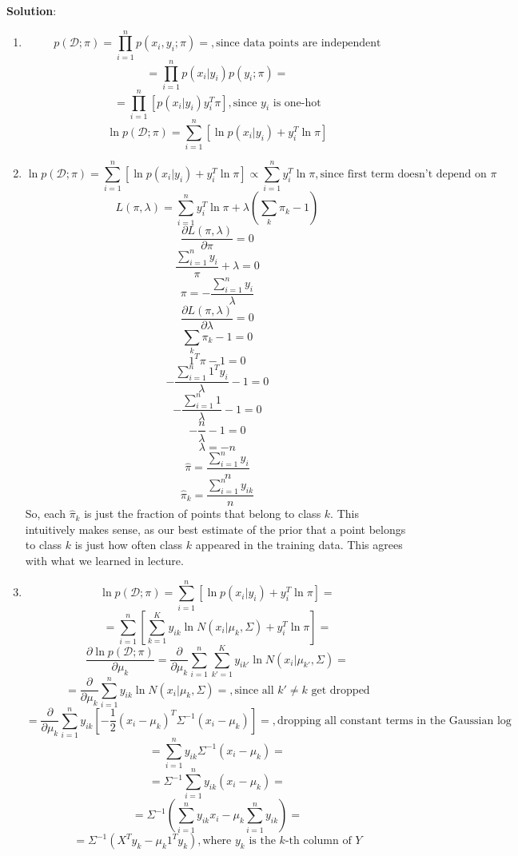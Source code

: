 \documentclass[submit]{../harvardml}
\newenvironment{solution}{
    \vspace{2mm}
    \color{blue}\noindent\textbf{Solution}:
}{}
\begin{document}
\begin{solution}
	\begin{enumerate}
	    \item $$p(\mathcal{D} ; \pi) = \prod_{i = 1}^np(x_i, y_i;\pi) = ,\text{since data points are independent}$$
        $$ = \prod_{i = 1}^np(x_i| y_i)p(y_i;\pi)=$$
        $$ = \prod_{i = 1}^n[p(x_i| y_i)y_i^T\pi], \text{since $y_i$ is one-hot}$$
        $$\ln p(\mathcal{D} ; \pi) = \sum_{i = 1}^n[\ln p(x_i| y_i) + y_i^T\ln \pi]$$
        \item $$\ln p(\mathcal{D} ; \pi) = \sum_{i = 1}^n[\ln p(x_i| y_i) + y_i^T\ln \pi] \propto \sum_{i = 1}^n y_i^T\ln \pi, \text{since first term doesn't depend on $\pi$}$$
        $$L(\pi, \lambda) = \sum_{i = 1}^n y_i^T\ln \pi +  \lambda (\sum_k\pi_k - 1)$$
        $$\frac{\partial L(\pi, \lambda)}{\partial  \pi} = 0$$
        $$\frac{\sum_{i = 1}^n y_i}{\pi} +  \lambda= 0$$
        $$\pi = -\frac{\sum_{i = 1}^n y_i}{\lambda}$$
        $$\frac{\partial L(\pi, \lambda)}{\partial \lambda} = 0$$
        $$\sum_k\pi_k - 1 = 0$$
        $$1^T\pi - 1 = 0$$
        $$-\frac{\sum_{i = 1}^n1^T y_i}{\lambda} - 1 = 0$$
        $$-\frac{\sum_{i = 1}^n1}{\lambda} - 1 = 0$$
        $$-\frac{n}{\lambda} - 1 = 0$$
        $$\lambda = -n$$
        $$\hat \pi = \frac{\sum_{i = 1}^n y_i}{n}$$
        $$\hat \pi_k = \frac{\sum_{i = 1}^n y_{ik}}{n}$$
        So, each $\hat \pi_k$ is just the fraction of points that belong to class $k$. This intuitively makes sense, as our best estimate of the prior that a point belongs to class $k$ is just how often class $k$ appeared in the training data. This agrees with what we learned in lecture.
        \item $$\ln p(\mathcal{D} ; \pi) = \sum_{i = 1}^n[\ln p(x_i| y_i) + y_i^T\ln \pi] =$$
        $$= \sum_{i = 1}^n[\sum_{k = 1}^Ky_{ik}\ln N(x_i|\mu_k, \Sigma) + y_i^T\ln \pi] =$$
        $$\frac{\partial \ln p(\mathcal{D} ; \pi)}{\partial \mu_k} = \frac{\partial }{\partial \mu_k} \sum_{i = 1}^n\sum_{k' = 1}^Ky_{ik'}\ln N(x_i|\mu_{k'}, \Sigma)= $$
        $$= \frac{\partial }{\partial \mu_k} \sum_{i = 1}^ny_{ik}\ln N(x_i|\mu_{k}, \Sigma)=, \text{since all $k' \neq k$ get dropped}$$
        $$= \frac{\partial }{\partial \mu_k} \sum_{i = 1}^ny_{ik}[-\frac{1}{2}(x_i - \mu_k)^T\Sigma^{-1}(x_i - \mu_k)]=, \text{dropping all constant terms in the Gaussian log}$$
        $$= \sum_{i = 1}^ny_{ik}\Sigma^{-1}(x_i - \mu_k)=$$
        $$= \Sigma^{-1}\sum_{i = 1}^ny_{ik}(x_i - \mu_k)=$$
        $$= \Sigma^{-1}(\sum_{i = 1}^ny_{ik}x_i - \mu_k\sum_{i = 1}^ny_{ik})=$$
        $$= \Sigma^{-1}(X^Ty_k - \mu_k1^Ty_k), \text{where $y_k$ is the $k$-th column of $Y$}$$

\end{enumerate}
\end{solution}
\end{document}
